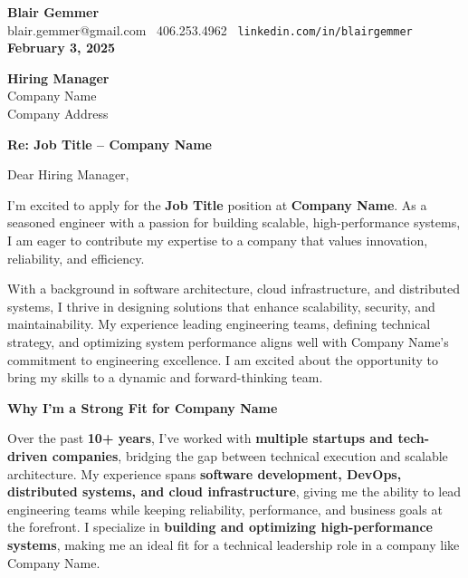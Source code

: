 \documentclass[a4paper,10.5pt]{article}
\makeatletter
\newcommand{\applicantName}{Blair Gemmer}
\newcommand{\applicantEmail}{blair.gemmer@gmail.com }
\newcommand{\applicantPhone}{406.253.4962 }
\newcommand{\linkedinURL}{\texttt{linkedin.com/in/blairgemmer}}
\newcommand{\applicationDate}{February 3, 2025}
\newcommand{\companyName}{Company Name}
\newcommand{\hiringManager}{Hiring Manager}
\newcommand{\companyAddress}{Company Address}
\newcommand{\jobTitle}{Job Title}
\makeatother
\begin{document}
\begin{flushleft}
\textbf{\large \applicantName} \\
\applicantEmail \textbar\ \applicantPhone \textbar\ \linkedinURL \\
\textbf{\applicationDate}  
\end{flushleft}

\begin{flushleft}
\textbf{\hiringManager} \\
\companyName \\  
\companyAddress  
\end{flushleft}

\vspace{0.5cm}

\noindent
\textbf{Re: \jobTitle{} -- \companyName{}}

\vspace{0.5cm}

\noindent
Dear \hiringManager,

\vspace{0.5cm}

I’m excited to apply for the \textbf{\jobTitle} position at \textbf{\companyName}. As a seasoned engineer with a passion for building scalable, high-performance systems, I am eager to contribute my expertise to a company that values innovation, reliability, and efficiency. 

With a background in software architecture, cloud infrastructure, and distributed systems, I thrive in designing solutions that enhance scalability, security, and maintainability. My experience leading engineering teams, defining technical strategy, and optimizing system performance aligns well with \companyName’s commitment to engineering excellence. I am excited about the opportunity to bring my skills to a dynamic and forward-thinking team.


\vspace{0.5cm}

\noindent
\textbf{Why I’m a Strong Fit for \companyName}

Over the past \textbf{10+ years}, I’ve worked with \textbf{multiple startups and tech-driven companies}, bridging the gap between technical execution and scalable architecture. My experience spans \textbf{software development, DevOps, distributed systems, and cloud infrastructure}, giving me the ability to lead engineering teams while keeping reliability, performance, and business goals at the forefront. I specialize in \textbf{building and optimizing high-performance systems}, making me an ideal fit for a technical leadership role in a company like \companyName.
\end{document}
